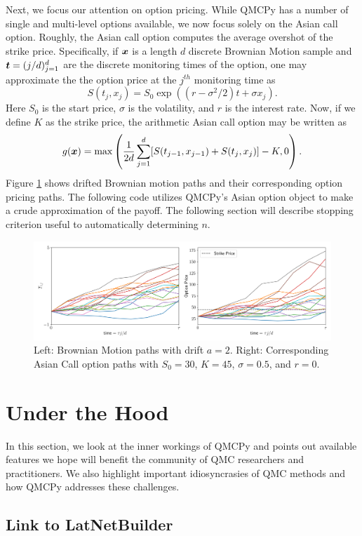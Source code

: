 \documentclass[graybox,footinfo]{svmult}
\begin{document}
Next, we focus our attention on option pricing. While QMCPy has a number of single and multi-level options available, we now focus solely on the Asian call option. Roughly, the  Asian call option computes the average overshot of the strike price. Specifically, if ${\boldsymbol{x}}$ is a length $d$ discrete Brownian Motion sample and ${\boldsymbol{t}} = (j/d)_{j=1}^d$ are the discrete monitoring times of the option, one may approximate the the option price at the $j^{th}$ monitoring time as 
$$S(t_j,x_j) = S_0 \exp((r-\sigma^2/2)t+\sigma x_j).$$
Here $S_0$ is the start price, $\sigma$ is the volatility, and $r$ is the interest rate. Now, if we define $K$ as the strike price, the arithmetic Asian call option may be written as 
$$g({\boldsymbol{x}}) = \max\left(\frac{1}{2d}\sum_{j=1}^d [S(t_{j-1},x_{j-1})+S(t_j,x_j)]-K,0\right).$$
Figure \ref{fig:aco} shows drifted Brownian motion paths and their corresponding option pricing paths. The following code utilizes QMCPy's Asian option object to make a crude approximation of the payoff. The following section will describe stopping criterion useful to automatically determining $n$. 

\begin{figure}
	\centering
	\includegraphics[width=1\textwidth]{QMCSoftwareArticle/figs/i_aco.png} 
	\caption{Left: Brownian Motion paths with drift $a=2$. Right: Corresponding Asian Call option paths with $S_0=30$, $K=45$, $\sigma=0.5$, and $r=0$.}
	\label{fig:aco}
\end{figure}

\section{Under the Hood}

In this section, we look at the inner workings of QMCPy and points out available features we hope will benefit the community of QMC researchers and practitioners. We also highlight important idiosyncrasies of QMC methods and how QMCPy addresses these challenges. 

\subsection{Link to LatNetBuilder}
\end{document}
